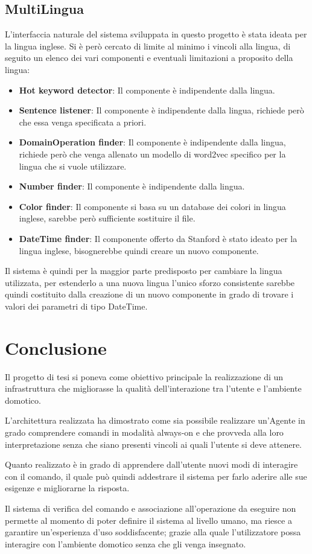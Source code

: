 \documentclass[twoside]{supsistudent}
\begin{document}
\section{MultiLingua}
L'interfaccia naturale del sistema sviluppata in questo progetto è stata ideata per la lingua inglese. Si è però cercato di limite al minimo i vincoli alla lingua, di seguito un elenco dei vari componenti e eventuali limitazioni a proposito della lingua:
\begin{itemize}
      \item \textbf{Hot keyword detector}: Il componente è indipendente dalla lingua.
      \item \textbf{Sentence listener}: Il componente è indipendente dalla lingua, richiede però che essa venga specificata a priori.
      \item \textbf{DomainOperation finder}: Il componente è indipendente dalla lingua, richiede però che venga allenato un modello di word2vec specifico per la lingua che si vuole utilizzare.
      \item \textbf{Number finder}: Il componente è indipendente dalla lingua.
      \item \textbf{Color finder}: Il componente si basa su un database dei colori in lingua inglese, sarebbe però sufficiente sostituire il file.
      \item \textbf{DateTime finder}: Il componente offerto da Stanford è stato ideato per la lingua inglese, bisognerebbe quindi creare un nuovo componente.
\end{itemize}
Il sistema è quindi per la maggior parte predisposto per cambiare la lingua utilizzata, per estenderlo a una nuova lingua l'unico sforzo consistente sarebbe quindi costituito dalla creazione di un nuovo componente in grado di trovare i valori dei parametri di tipo DateTime.
\chapter{Conclusione}
Il progetto di tesi si poneva come obiettivo principale la realizzazione di un infrastruttura che migliorasse la qualità dell'interazione tra l'utente e l'ambiente domotico.

L'architettura realizzata ha dimostrato come sia possibile realizzare un'Agente in grado comprendere comandi in modalità always-on e che provveda alla loro interpretazione senza che siano presenti vincoli ai quali l'utente si deve attenere.

Quanto realizzato è in grado di apprendere dall'utente nuovi modi di interagire con il comando, il quale può quindi addestrare il sistema per farlo aderire alle sue esigenze e migliorarne la risposta.

Il sistema di verifica del comando e associazione all'operazione da eseguire non permette al momento di poter definire il sistema al livello umano, ma riesce a garantire un'esperienza d'uso soddisfacente; grazie alla quale l'utilizzatore possa interagire con l'ambiente domotico senza che gli venga insegnato.





\end{document}
